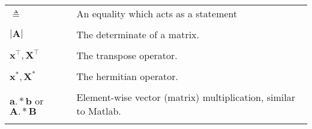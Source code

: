 \begin{longtable}{lp{}}
    $\triangleq$                                      & An equality which acts as a statement                                                                                                                                                                                                                                                                                                                                                                                                                                                                                                                                                                                                                                                                                                                                                                                                                                                                                                             \\\\
    $\left| \bm{A} \right|$                           & The determinate of a matrix.                                                                                                                                                                                                                                                                                                                                                                                                                                                                                                                                                                                                                                                                                                                                                                                                                                                                                                                      \\\\
    $\bm{x}^{\intercal}, \bm{X}^{\intercal}$          & The transpose operator.
    \\\\
    $\bm{x}^{\ast}, \bm{X}^{\ast}$                    & The hermitian operator.
    \\\\
    $\bm{a} .\ast \bm{b}$ or $\bm{A} .\ast \bm{B}$    & Element-wise vector (matrix) multiplication, similar to Matlab.
    \\\\

\end{longtable}
